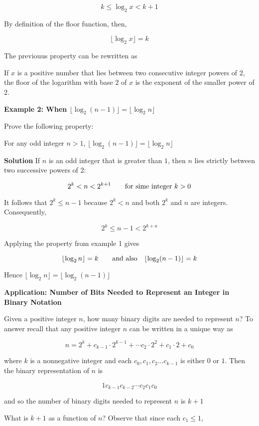 $$k\leq\log_2x<k+1$$

By definition of the floor function, then,

$$\lfloor\log_2x\rfloor=k$$

The previouus property can be rewritten as

\vskip 1mm
If $x$ is a positive number that lies between two consecutive integer powers of $2$, the floor of the logarithm with base $2$ of $x$ is the exponent of the smaller power of $2$.

\filbreak
\vskip 1cm
{\bf Example 2: When $\lfloor\log_2(n-1)\rfloor=\lfloor\log_2n\rfloor$}

\vskip 3mm
Prove the following property:

\vskip 1mm
For any odd integer $n>1$, $\lfloor\log_2(n-1)\rfloor=\lfloor\log_2n\rfloor$

\vskip 3mm
{\bf Solution}
\vskip 1mm
If $n$ is an odd integer that is greater than $1$, then $n$ lies strictly between two successive powers of $2$:

$$2^k<n<2^{k+1}\qquad\hbox{for sime integer $k>0$}$$

It follows that $2^k\leq n-1$ because $2^k<n$ and both $2^k$ and $n$ are integers. Consequently,

$$2^k\leq n-1< 2^{k+a}$$

Applying the property from example 1 gives

$$\lfloor\log_2n\rfloor=k\qquad\hbox{and also}\quad\lfloor\log_2(n-1)\rfloor=k$$

Hence $\lfloor\log_2n\rfloor=\lfloor\log_2(n-1)\rfloor$

\filbreak
\vskip 1cm
{\bf Application: Number of Bits Needed to Represent an Integer in Binary Notation}

\vskip 3mm
Given a positive integer $n$, how many binary digits are needed to represent $n$? To answer recall that any positive integer $n$ can be written in a unique way as

$$n=2^k+c_{k-1}\cdot 2^{k-1}+\cdots c_2\cdot 2^2+c_1\cdot 2+c_0$$

where $k$ is a nonnegative integer and each $c_0,c_1,c_2\ldots c_{k-1}$ is either $0$ or $1$. Then the binary representation of $n$ is

$$1c_{k-1}c_{k-2}\cdots c_2c_1c_0$$

and so the number of binary digits needed to represent $n$ is $k+1$

\vskip 1mm
What is $k+1$ as a function of $n$? Observe that since each $c_1\leq 1$,

